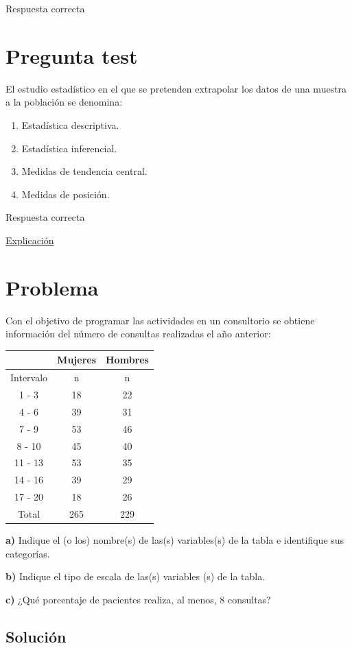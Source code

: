 \documentclass[
]{book}
\providecommand{\tightlist}{%
  \setlength{\itemsep}{0pt}\setlength{\parskip}{0pt}}
\begin{document}
Respuesta correcta

\hypertarget{pregunta-test-15}{%
\section{Pregunta test}\label{pregunta-test-15}}

El estudio estadístico en el que se pretenden extrapolar los datos de una muestra a la población se denomina:

\begin{enumerate}
\def\labelenumi{\alph{enumi})}
\tightlist
\item
  Estadística descriptiva.
\item
  Estadística inferencial.
\item
  Medidas de tendencia central.
\item
  Medidas de posición.
\end{enumerate}

Respuesta correcta

\href{https://1fjmanzano.github.io/bioestadistica/inferencia-estad\%C3\%ADstica.html}{Explicación}

\hypertarget{problema-2}{%
\section{Problema}\label{problema-2}}

Con el objetivo de programar las actividades en un consultorio se obtiene información del número de consultas realizadas el año anterior:

\begin{longtable}[]{@{}ccc@{}}
\toprule
& Mujeres & Hombres\tabularnewline
\midrule
\endhead
Intervalo & n & n\tabularnewline
1 - 3 & 18 & 22\tabularnewline
4 - 6 & 39 & 31\tabularnewline
7 - 9 & 53 & 46\tabularnewline
8 - 10 & 45 & 40\tabularnewline
11 - 13 & 53 & 35\tabularnewline
14 - 16 & 39 & 29\tabularnewline
17 - 20 & 18 & 26\tabularnewline
Total & 265 & 229\tabularnewline
\bottomrule
\end{longtable}

\textbf{a)} Indique el (o los) nombre(s) de las(s) variables(s) de la tabla e identifique sus categorías.

\textbf{b)} Indique el tipo de escala de las(s) variables (s) de la tabla.

\textbf{c)} ¿Qué porcentaje de pacientes realiza, al menos, 8 consultas?

\hypertarget{soluciuxf3n-2}{%
\subsection{Solución}\label{soluciuxf3n-2}}
\end{document}
